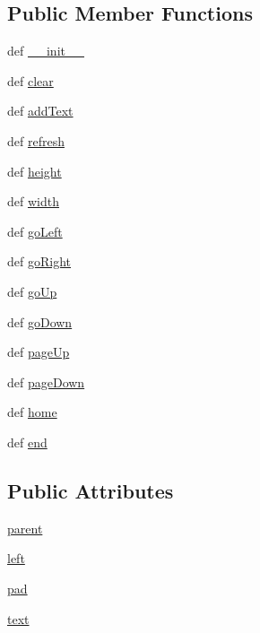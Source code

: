 \subsection*{Public Member Functions}
\begin{DoxyCompactItemize}
\item 
def \hyperlink{classcurseshelpers_1_1BottomText_a29c4cb2d8117a76ce92fd545848c86a3}{\-\_\-\-\_\-init\-\_\-\-\_\-}
\item 
def \hyperlink{classcurseshelpers_1_1BottomText_ab9b7b50802efc07f24b760c6befd7f76}{clear}
\item 
def \hyperlink{classcurseshelpers_1_1BottomText_aba696973f4c04c3f764248c6e6a68c0f}{add\-Text}
\item 
def \hyperlink{classcurseshelpers_1_1BottomText_aba6cfbdff0d7ad0262524db8afac79b9}{refresh}
\item 
def \hyperlink{classcurseshelpers_1_1BottomText_a9f34e44c103f7b6fd0a7ce87c35e00eb}{height}
\item 
def \hyperlink{classcurseshelpers_1_1BottomText_a170c417aa58b905b1ce2e3a21f786fe3}{width}
\item 
def \hyperlink{classcurseshelpers_1_1BaseElement_a8dad4b03794798c7b6de02554312859f}{go\-Left}
\item 
def \hyperlink{classcurseshelpers_1_1BaseElement_aac34d4e8081c795ff91dd124a997cf2a}{go\-Right}
\item 
def \hyperlink{classcurseshelpers_1_1BaseElement_a47e7464786cfdd6385fe505ee2772c16}{go\-Up}
\item 
def \hyperlink{classcurseshelpers_1_1BaseElement_aae5772912da5ae17cf36974d2bf60666}{go\-Down}
\item 
def \hyperlink{classcurseshelpers_1_1BaseElement_aaebbd0ee80116ea05a5cadaafd57bb69}{page\-Up}
\item 
def \hyperlink{classcurseshelpers_1_1BaseElement_aef505ea0e4fc4250fe449dd861ed6160}{page\-Down}
\item 
def \hyperlink{classcurseshelpers_1_1BaseElement_ad3a96d465acebec374d19b830aade6c9}{home}
\item 
def \hyperlink{classcurseshelpers_1_1BaseElement_a1598dce258dc2f0421dafa5846c7bd88}{end}
\end{DoxyCompactItemize}
\subsection*{Public Attributes}
\begin{DoxyCompactItemize}
\item 
\hyperlink{classcurseshelpers_1_1BottomText_a613145a47642613884806b3b739c0e15}{parent}
\item 
\hyperlink{classcurseshelpers_1_1BottomText_aaed677fda789c4786cb83e2ec037cbc7}{left}
\item 
\hyperlink{classcurseshelpers_1_1BottomText_ab8cae6016b0cc80187f438894b3dd60a}{pad}
\item 
\hyperlink{classcurseshelpers_1_1BottomText_a30ba624d1f1200ef741de71bf5c445d1}{text}
\end{DoxyCompactItemize}
